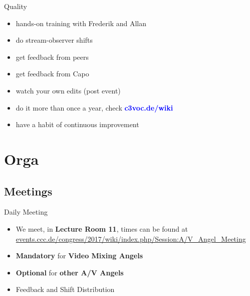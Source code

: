 \documentclass[hyperref={pdfpagelabels=false},aspectratio=169]{beamer}
\begin{document}
\begin{frame}{Quality}
\begin{itemize} %
\item hands-on training with Frederik and Allan %
\item do stream-observer shifts %
\item get feedback from peers %
\item get feedback from Capo %
\item watch your own edits (post event) %
\item do it more than once a year, check 
\textcolor{blue}{\textbf{c3voc.de/wiki }} %
\item have a habit of continuous improvement %
\end{itemize} 
\end{frame}

\section{Orga} %
\subsection{Meetings}
\begin{frame}{Daily Meeting}
\begin{itemize}
\item  We meet, in \textbf{Lecture Room 11}, times can be found at 
\renewcommand\UrlFont{\color{blue}\sffamily\textbf} 
\url{events.ccc.de/congress/2017/wiki/index.php/Session:A/V_Angel_Meeting}
\item  \textbf{Mandatory} for \textbf{Video Mixing Angels}
\item  \textbf{Optional} for \textbf{other A/V Angels}
\item  Feedback and Shift Distribution
\end{itemize} 
\end{frame}
\end{document}
